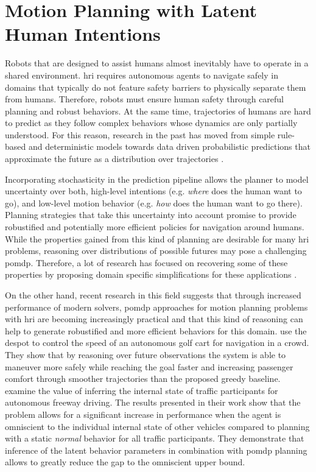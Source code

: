 \chapter{Motion Planning with Latent Human Intentions}\label{chap:hri}

Robots that are designed to assist humans almost inevitably have to operate in
a shared environment. \ac{hri} requires autonomous agents to navigate
safely in domains that typically do not feature safety barriers to physically
separate them from humans. Therefore, robots must ensure human safety through
careful planning and robust behaviors. At the same time, trajectories of humans
are hard to predict as they follow complex behaviors whose dynamics are only
partially understood. For this reason, research in the past has
moved from simple rule-based and deterministic models 
towards data driven probabilistic predictions that approximate the future as
a distribution over trajectories .


Incorporating stochasticity in the prediction pipeline allows the planner to
model uncertainty over both, high-level intentions (e.g. \emph{where} does the
human want to go), and low-level motion behavior (e.g. \emph{how} does the
human want to go there). Planning strategies that take this uncertainty into
account promise to provide robustified and potentially more efficient policies
for navigation around humans. While the properties gained from this kind of
planning are desirable for many \ac{hri} problems, reasoning over distributions
of possible futures may pose a challenging \ac{pomdp}. Therefore, a lot of
research has focused on recovering some of these properties by proposing domain
specific simplifications for these applications \cite{fern2007decision,
sadigh2016information, javdani2018shared, fisac2018probabilistically}.

On the other hand, recent research in this field suggests that through
increased performance of modern solvers, \ac{pomdp} approaches for motion
planning problems with \ac{hri} are becoming increasingly practical and that
this kind of reasoning can help to generate robustified and more efficient
behaviors for this domain. \cite{bai2015intention} use the \ac{despot} to
control the speed of an autonomous golf cart for navigation in a crowd. They
show that by reasoning over future observations the system is able to maneuver
more safely while reaching the goal faster and increasing passenger comfort
through smoother trajectories than the proposed greedy baseline.
\cite{sunberg2017value} examine the value of inferring the internal state of
traffic participants for autonomous freeway driving. The results presented in
their work show that the problem allows for a significant increase in
performance when the agent is omniscient to the individual internal state of
other vehicles compared to planning with a static \emph{normal} behavior for
all traffic participants. They demonstrate that inference of the latent
behavior parameters in combination with \ac{pomdp} planning allows to greatly
reduce the gap to the omniscient upper bound.

